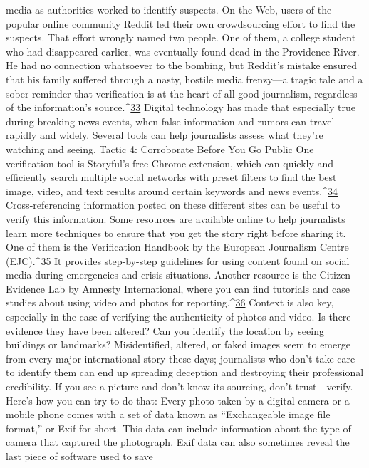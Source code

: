 media as authorities worked to identify suspects.
On the Web, users of the popular online community Reddit led their own crowdsourcing
effort to find the suspects. That effort wrongly named two people. One of them, a college
student who had disappeared earlier, was eventually found dead in the Providence River.
He had no connection whatsoever to the bombing, but Reddit’s mistake ensured that his
family suffered through a nasty, hostile media frenzy—a tragic tale and a sober reminder
that verification is at the heart of all good journalism, regardless of the information’s
source.^{\href{#endnotes}{33}}
Digital technology has made that especially true during breaking news events, when false
information and rumors can travel rapidly and widely. Several tools can help journalists
assess what they’re watching and seeing.
Tactic 4: Corroborate Before You Go Public
One verification tool is Storyful’s free Chrome extension, which can quickly and
efficiently search multiple social networks with preset filters to find the best image,
video, and text results around certain keywords and news events.^{\href{#endnotes}{34}} Cross-referencing
information posted on these different sites can be useful to verify this information.
Some resources are available online to help journalists learn more techniques to ensure
that you get the story right before sharing it. One of them is the Verification Handbook by
the European Journalism Centre (EJC).^{\href{#endnotes}{35}} It provides step-by-step guidelines for using
content found on social media during emergencies and crisis situations. Another resource
is the Citizen Evidence Lab by Amnesty International, where you can find tutorials and
case studies about using video and photos for reporting.^{\href{#endnotes}{36}}
Context is also key, especially in the case of verifying the authenticity of photos and
video. Is there evidence they have been altered? Can you identify the location by seeing
buildings or landmarks? Misidentified, altered, or faked images seem to emerge from
every major international story these days; journalists who don’t take care to identify
them can end up spreading deception and destroying their professional credibility. If you
see a picture and don’t know its sourcing, don’t trust—verify.
Here’s how you can try to do that: Every photo taken by a digital camera or a mobile
phone comes with a set of data known as ``Exchangeable image file format,'' or Exif for
short. This data can include information about the type of camera that captured the
photograph. Exif data can also sometimes reveal the last piece of software used to save
